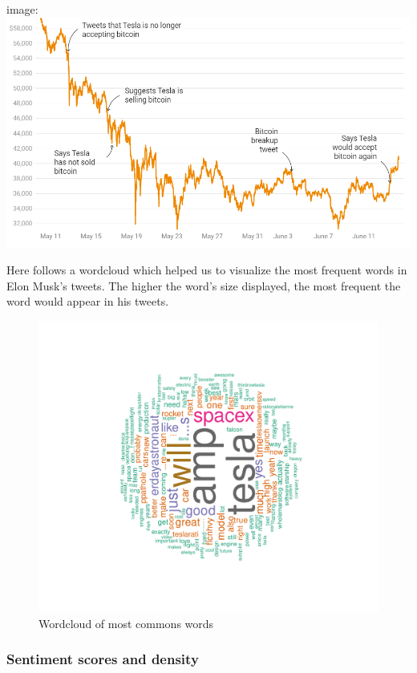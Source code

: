\documentclass[
]{article}
\begin{document}
image: \includegraphics{events_image.jpg}

Here follows a wordcloud which helped us to visualize the most frequent
words in Elon Musk's tweets. The higher the word's size displayed, the
most frequent the word would appear in his tweets.

\begin{figure}
\centering
\includegraphics{Trial1_files/figure-latex/fig5-1.pdf}
\caption{\label{fig:fig5}Wordcloud of most commons words}
\end{figure}

\hypertarget{sentiment-scores-and-density}{%
\subsubsection{Sentiment scores and
density}\label{sentiment-scores-and-density}}
\end{document}
